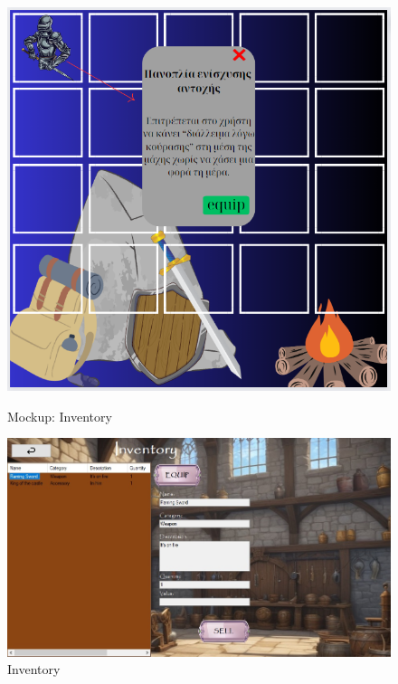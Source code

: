 \begin{figure}[h]
    \centering
    \begin{minipage}[b]{0.45\textwidth}
        \centering
    \includegraphics[width=\textwidth]{omockup7.jpg}
    \caption{Mockup: Inventory}
    \end{minipage}
    \hfill
    \begin{minipage}[b]{0.45\textwidth}
        \centering
    \includegraphics[width=\textwidth]{mockup7.jpg}
    \caption{Inventory}
    \end{minipage}
\end{figure}



